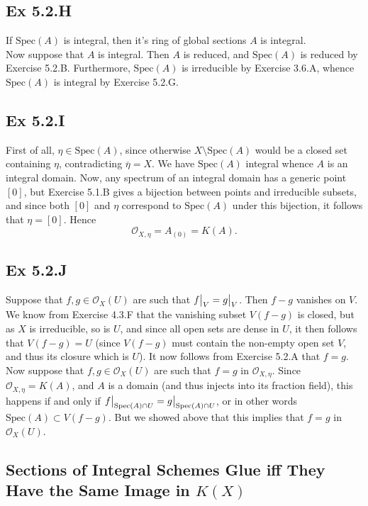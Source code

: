 \documentclass{article}
\newcommand\restr[2]{{%
  \left.\kern-\nulldelimiterspace %
  #1 %
  \vphantom{\big|} %
  \right|_{#2} %
  }}
\theoremstyle{definition}
\newcommand{\oo}{\mathcal{O}}
\newcommand{\ox}{\mathcal{O}_X}
\newcommand{\Spec}{\text{Spec}}
\begin{document}
\subsection*{Ex 5.2.H}

If $\Spec(A)$ is integral, then it's ring of global sections $A$ is integral. \\

Now suppose that $A$ is integral. Then $A$ is reduced, and $\Spec(A)$ is
reduced by Exercise 5.2.B. Furthermore, $\Spec(A)$ is irreducible by Exercise
3.6.A, whence $\Spec(A)$ is integral by Exercise 5.2.G.

\subsection*{Ex 5.2.I}

First of all, $\eta \in \Spec(A)$, since otherwise $X \setminus \Spec(A)$ would
be a closed set containing $\eta$, contradicting $\overline{\eta} = X$. We have
$\Spec(A)$ integral whence $A$ is an integral domain. Now, any spectrum of an
integral domain has a generic point $[0]$, but Exercise 5.1.B gives a bijection
between points and irreducible subsets, and since both $[0]$ and $\eta$
correspond to $\Spec(A)$ under this bijection, it follows that $\eta = [0]$.
Hence
\[
	\oo_{X, \eta}
	=
	A_{(0)}
	=
	K(A).
\]

\subsection*{Ex 5.2.J}

Suppose that $f, g \in \ox(U)$ are such that $\restr{f}{V} = \restr{g}{V}$.
Then $f - g$ vanishes on $V$. We know from Exercise 4.3.F that the vanishing
subset $V(f - g)$ is closed, but as $X$ is irreducible, so is $U$, and since
all open sets are dense in $U$, it then follows that $V(f - g) = U$ (since $V(f
	- g)$ must contain the non-empty open set $V$, and thus its closure which is
$U$). It now follows from Exercise 5.2.A that $f = g$. \\

Now suppose that $f, g \in \ox(U)$ are such that $f = g$ in $\oo_{X, \eta}$.
Since $\oo_{X, \eta} = K(A)$, and $A$ is a domain (and thus injects into its
fraction field), this happens if and only if $\restr{f}{\Spec(A) \cap U} =
	\restr{g}{\Spec(A) \cap U}$, or in other words $\Spec(A) \subset V(f - g)$. But
we showed above that this implies that $f = g$ in $\ox(U)$.

\subsection*{Sections of Integral Schemes Glue iff They Have the Same Image in $K(X)$}
\end{document}
